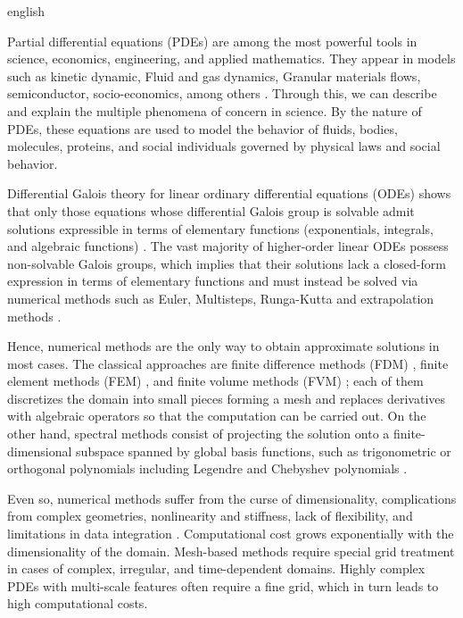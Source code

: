 
\begin{hyphenrules}{english}

\label{ch:introduction}

Partial differential equations (PDEs) are among the most powerful tools in science, economics,
engineering, and applied mathematics. They appear in models such as kinetic dynamic, Fluid and gas dynamics, Granular materials flows, semiconductor, socio-economics, among others \cite{markowich2007applied}.
Through this, we can describe and explain the multiple phenomena of concern in science. By the nature
of PDEs, these equations are used to model the behavior of fluids, bodies, molecules, proteins, and
social individuals governed by physical laws and social behavior.

Differential Galois theory for linear ordinary differential equations (ODEs) shows that only those
equations whose differential Galois group is solvable admit solutions expressible in terms of
elementary functions (exponentials, integrals, and algebraic functions)
\cite{vanderput2003}. The vast majority of higher-order linear ODEs possess
non-solvable Galois groups, which implies that their solutions lack a closed-form expression in terms
of elementary functions and must instead be solved via numerical methods such as Euler, Multisteps,  Runga-Kutta and extrapolation methods \cite{hairer1993solving, iserles1996first}.

Hence, numerical methods are the only way to obtain approximate solutions in most cases. The classical
approaches are finite difference methods (FDM) \cite{strikwerda2004}, finite element methods (FEM)
\cite{zienkiewicz2013}, and finite volume methods (FVM) \cite{moukalled2016}; each of them
discretizes the domain into small pieces forming a mesh and replaces derivatives with algebraic
operators so that the computation can be carried out. On the other hand, spectral methods consist of
projecting the solution onto a finite-dimensional subspace spanned by global basis functions, such as
trigonometric or orthogonal polynomials including Legendre and Chebyshev polynomials
\cite{shen2011}.

Even so, numerical methods suffer from the curse of dimensionality, complications from complex
geometries, nonlinearity and stiffness, lack of flexibility, and limitations in data integration
\cite{schwencke2025thesis}. Computational cost grows exponentially with the dimensionality of the
domain. Mesh-based methods require special grid treatment in cases of complex, irregular, and
time-dependent domains. Highly complex PDEs with multi-scale features often require a fine grid,
which in turn leads to high computational costs.


\end{hyphenrules}
